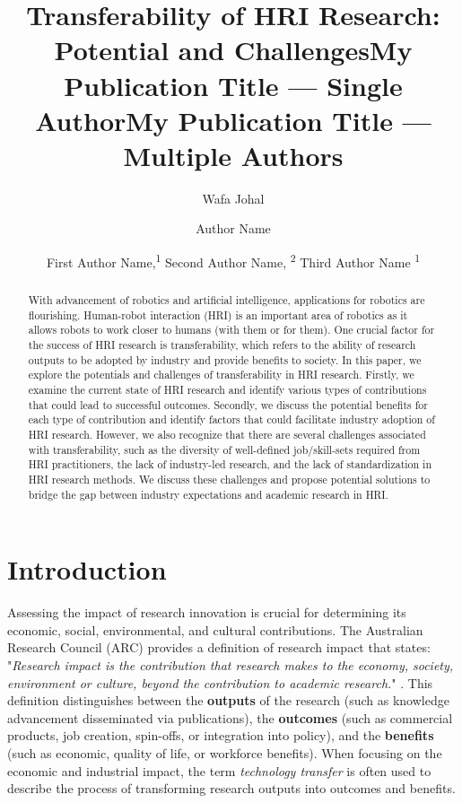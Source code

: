 \documentclass[letterpaper]{article} %
\title{Transferability of HRI Research: Potential and Challenges}
\author{
    Wafa Johal
}
\title{My Publication Title --- Single Author}
\author {
    Author Name
}
\title{My Publication Title --- Multiple Authors}
\author {
    First Author Name,\textsuperscript{\rm 1}
    Second Author Name, \textsuperscript{\rm 2}
    Third Author Name \textsuperscript{\rm 1}
}
\begin{document}
\maketitle

\begin{abstract}
With advancement of robotics and artificial intelligence, applications for robotics are flourishing. Human-robot interaction (HRI) is an important area of robotics as it allows robots to work closer to humans (with them or for them). 
One crucial factor for the success of HRI research is transferability, which refers to the ability of research outputs to be adopted by industry and provide benefits to society. 
In this paper, we explore the potentials and challenges of transferability in HRI research.
Firstly, we examine the current state of HRI research and identify various types of contributions that could lead to successful outcomes. Secondly, we discuss the potential benefits for each type of contribution and identify factors that could facilitate industry adoption of HRI research.
However, we also recognize that there are several challenges associated with transferability, such as the diversity of well-defined job/skill-sets required from HRI practitioners, the lack of industry-led research, and the lack of standardization in HRI research methods. We discuss these challenges and propose potential solutions to bridge the gap between industry expectations and academic research in HRI.
\end{abstract}


\section{Introduction}
Assessing the impact of research innovation is crucial for determining its economic, social, environmental, and cultural contributions.  The Australian Research Council (ARC) provides a definition of research impact that states: "\textit{Research impact is the contribution that research makes to the economy, society, environment or culture, beyond the contribution to academic research.}" \cite{ARC}.
This definition distinguishes between the \textbf{outputs} of the research (such as knowledge advancement disseminated via publications), the \textbf{outcomes} (such as commercial products, job creation, spin-offs, or integration into policy), and the \textbf{benefits} (such as economic, quality of life, or workforce benefits). 
When focusing on the economic and industrial impact, the term \emph{technology transfer} is often used to describe the process of transforming research outputs into outcomes and benefits. 
\end{document}
